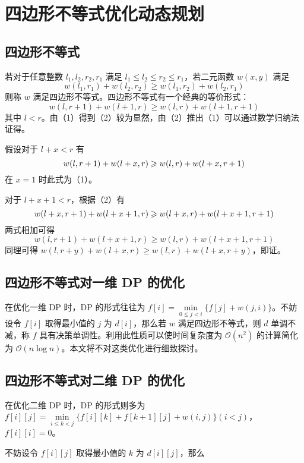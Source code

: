 
\chapter{四边形不等式优化动态规划}

\section{四边形不等式}

若对于任意整数 \(l_1,l_2,r_2,r_1\) 满足
\(l_1\le l_2\le r_2\le r_1\)，若二元函数 \(w(x,y)\) 满足 \[
w(l_1,r_1)+w(l_2,r_2)\ge w(l_1,r_2)+w(l_2,r_1)\tag{1}
\] 则称 \(w\) 满足四边形不等式。四边形不等式有一个经典的等价形式： \[
w(l,r+1)+w(l+1,r)\ge w(l,r)+w(l+1,r+1)\tag{2}
\] 其中
\(l < r\)。由（1）得到（2）较为显然，由（2）推出（1）可以通过数学归纳法证得。

假设对于 \(l+x < r\) 有 \[
w(l,r+1)+w(l+x,r)\ge w(l,r)+w(l+x,r+1)\\
\] 在 \(x=1\) 时此式为（1）。

对于 \(l+x+1 < r\)，根据（2）有 \[
w(l+x,r+1)+w(l+x+1,r)\ge w(l+x,r)+w(l+x+1,r+1)\\
\] 两式相加可得 \[
w(l,r+1)+w(l+x+1,r)\ge w(l,r)+w(l+x+1,r+1)
\] 同理可得 \(w(l,r+y)+w(l+x,r)\ge w(l,r)+w(l+x,r+y)\)，即证。

\section{四边形不等式对一维 DP 的优化}

在优化一维 DP 时，DP 的形式往往为
\(f[i]=\min\limits_{0\le j < i}\{f[j]+w(j,i)\}\)。不妨设令 \(f[i]\)
取得最小值的 \(j\) 为 \(d[i]\)，那么若 \(w\) 满足四边形不等式，则 \(d\)
单调不减，称 \(f\) 具有决策单调性。利用此性质可以使时间复杂度为
\(\mathcal{O}(n^2)\) 的计算简化为
\(\mathcal{O}(n\log n)\)。本文将不对这类优化进行细致探讨。

\section{四边形不等式对二维 DP 的优化}

在优化二维 DP 时，DP 的形式则多为
\(f[i][j]=\min\limits_{i\le k < j}\{f[i][k]+f[k+1][j]+w(i,j)\}(i < j)\)，\(f[i][i]=0\)。

不妨设令 \(f[i][j]\) 取得最小值的 \(k\) 为 \(d[i][j]\)，那么

